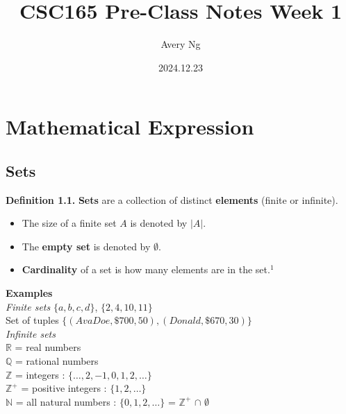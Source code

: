 \documentclass{article}
\title{CSC165 Pre-Class Notes Week 1}
\author{Avery Ng}
\date{2024.12.23}
\begin{document}
\maketitle

\section{Mathematical Expression}
\subsection{Sets}

\setlength{\parindent}{0pt}
    

\textbf{Definition 1.1.} \textbf{Sets} are a collection of distinct \textbf{elements} (finite or infinite). 
\begin{itemize}[itemsep=0pt] 
    \renewcommand{\labelitemi}{} %
    \footnotesize %
    \item The size of a finite set $A$ is denoted by $\lvert A \rvert$.
    \item The \textbf{empty set} is denoted by $\emptyset$.
    \item \textbf{Cardinality} of a set is how many elements
are in the set.$^{1}$
\end{itemize}


\textbf{Examples} \\
\emph{Finite sets } \hfill $\{a, b, c, d\}$, $\{2, 4, 10, 11\}$ \\
Set of tuples \hfill $\{(Ava Doe, \$ 700, 50), (Donald,\$ 670, 30)\}$ \\
\emph{Infinite sets} \\
$ \mathbb{R} $  = real numbers \\
$ \mathbb{Q} $ = rational numbers \\
$ \mathbb{Z}$ = integers : $ \{\ldots, 2, -1, 0, 1, 2, \ldots\} $ \\
$ \mathbb{Z}^{+} $ = positive integers : $ \{1, 2, \ldots\} $ \\
$ \mathbb{N} $ = all natural numbers : $\{ 0, 1, 2, \ldots \} $ = $ \mathbb{Z}^{+} $  $\cap$ {$\emptyset$}\\

\end{document}
